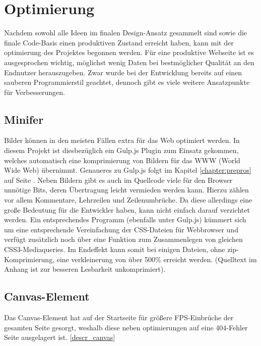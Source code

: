 \section{Optimierung}
Nachdem sowohl alle Ideen im finalen Design-Ansatz gesammelt sind sowie die finale Code-Basis einen produktiven Zustand erreicht haben, kann mit der optimierung des Projektes begonnen werden. Für eine produktive Webseite ist es ausgesprochen wichtig, möglichst wenig Daten bei bestmöglicher Qualität an den Endnutzer herauszugeben. Zwar wurde bei der Entwicklung bereits auf einen sauberen Programmierstil geachtet, dennoch gibt es viele weitere Ansatzpunkte für Verbesserungen.

\subsection{Minifer}
Bilder können in den meisten Fällen extra für das Web optimiert werden. In diesem Projekt ist diesbezüglich ein Gulp.js Plugin zum Einsatz gekommen, welches automatisch eine komprimierung von Bildern für das WWW (World Wide Web) übernimmt. Genaueres zu Gulp.js folgt im Kapitel \ref{chapter:prepros} auf Seite \pageref{chapter:prepros}.
Neben Bildern gibt es auch im Quellcode viele für den Browser unnötige Bits, deren Übertragung leicht vermieden werden kann. Hierzu zählen vor allem Kommentare, Lehrzeilen und Zeilenumbrüche. Da diese allerdings eine große Bedeutung für die Entwickler haben, kann nicht einfach darauf verzichtet werden. Ein entsprechendes Programm (ebenfalls unter Gulp.js) kümmert sich um eine entsprechende Vereinfachung der CSS-Dateien für Webbrowser und verfügt zusätzlich noch über eine Funktion zum Zusammenlegen von gleichen CSS3-Mediaqueries. Im Endeffekt kann somit bei einigen Dateien, ohne zip-Komprimierung, eine verkleinerung von über 500\% erreicht werden. (Quelltext im Anhang ist zur besseren Lesbarkeit unkomprimiert).

\subsection{Canvas-Element}
Das Canvas-Element hat auf der Startseite für größere FPS-Einbrüche der gesamten Seite gesorgt, weshalb diese neben optimierungen auf eine 404-Fehler Seite ausgelagert ist. \ref{descr_canvas}
